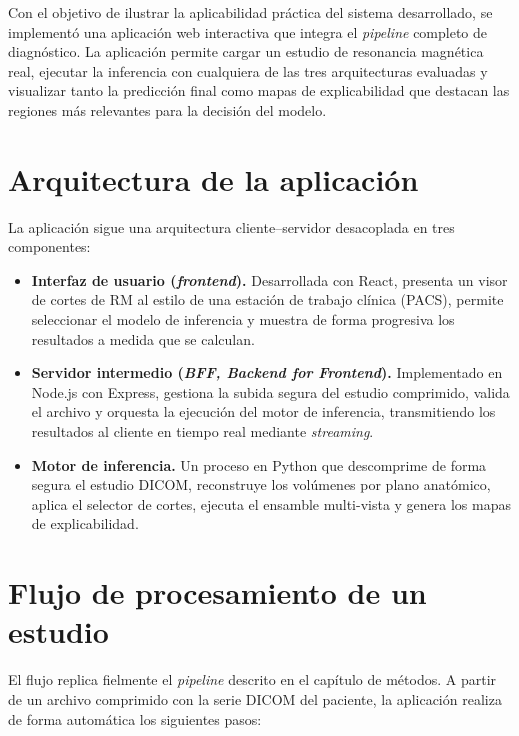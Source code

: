 \label{cap:aplicacion}

Con el objetivo de ilustrar la aplicabilidad práctica del sistema desarrollado, se implementó una aplicación web interactiva que integra el \textit{pipeline} completo de diagnóstico. La aplicación permite cargar un estudio de resonancia magnética real, ejecutar la inferencia con cualquiera de las tres arquitecturas evaluadas y visualizar tanto la predicción final como mapas de explicabilidad que destacan las regiones más relevantes para la decisión del modelo.

\section{Arquitectura de la aplicación}

La aplicación sigue una arquitectura cliente--servidor desacoplada en tres componentes:

\begin{itemize}
    \item \textbf{Interfaz de usuario (\textit{frontend}).} Desarrollada con React, presenta un visor de cortes de RM al estilo de una estación de trabajo clínica (PACS), permite seleccionar el modelo de inferencia y muestra de forma progresiva los resultados a medida que se calculan.

    \item \textbf{Servidor intermedio (\textit{BFF, Backend for Frontend}).} Implementado en Node.js con Express, gestiona la subida segura del estudio comprimido, valida el archivo y orquesta la ejecución del motor de inferencia, transmitiendo los resultados al cliente en tiempo real mediante \textit{streaming}.

    \item \textbf{Motor de inferencia.} Un proceso en Python que descomprime de forma segura el estudio DICOM, reconstruye los volúmenes por plano anatómico, aplica el selector de cortes, ejecuta el ensamble multi-vista y genera los mapas de explicabilidad.
\end{itemize}

\section{Flujo de procesamiento de un estudio}

El flujo replica fielmente el \textit{pipeline} descrito en el capítulo de métodos. A partir de un archivo comprimido con la serie DICOM del paciente, la aplicación realiza de forma automática los siguientes pasos:

